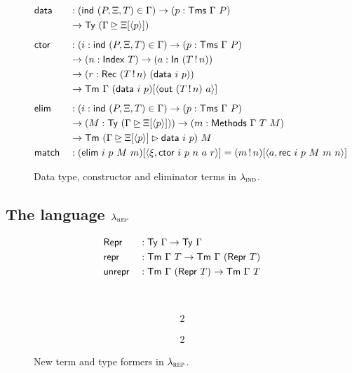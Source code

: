 \begin{figure}[H]
  \begin{alignat*}{2}
  & \mta{data} &&: (\mta{ind}\ (P, \Xi, T) \in \Gamma) \to (p : \Tms\ \Gamma\ P) \\ 
  &            && \to \Ty\ (\Gamma \unrhd \Xi[\langle p \rangle]) \\[0.5em]
  & \mta{ctor} &&: (i : \mta{ind}\ (P, \Xi, T) \in \Gamma) \to (p : \Tms\ \Gamma\ P) \\
  &            && \to (n : \mta{Index}\ T) \to (a : \mta{In}\ (T \, ! \, n)) \\
  &            && \to (r : \mta{Rec}\ (T \, ! \, n)\ (\mta{data}\ i\ p)) \\
  &            && \to \Tm\ \Gamma\ (\mta{data}\ i\ p) [\langle \mta{out}\ (T\,!\,n)\ a \rangle] \\[0.5em]
  & \mta{elim} &&: (i : \mta{ind}\ (P, \Xi, T) \in \Gamma) \to (p : \Tms\ \Gamma\ P) \\
  &            && \to (M : \Ty\ (\Gamma \unrhd \Xi[\langle p \rangle])) \to (m : \mta{Methods}\ \Gamma\ T\ M) \\
  &            && \to \Tm\ (\Gamma \unrhd \Xi[\langle p \rangle] \rhd \mta{data}\ i\ p)\ M \\
  & \mta{match} &&: (\mta{elim}\ i\ p\ M\ m)[\langle \xi, \mta{ctor}\ i\ p\ n\ a\ r \rangle] = (m\,!\,n)[\langle a , \mta{rec}\ i\ p\ M\ m\ n \rangle]
  \end{alignat*}
  \caption{Data type, constructor and eliminator terms in $\lambda_{\textsc{ind}}$.}
  \label{fig:lambdaind-data-ctor}
\end{figure}

\subsection{The language $\lambda_{\textsc{rep}}$}

\begin{figure}[H]
  \begin{minipage}[t]{\textwidth}%
  \begin{alignat*}{2}
  & \textsf{Repr} &&: \textsf{Ty}\ \Gamma \to \textsf{Ty}\ \Gamma \\
  & \textsf{repr} &&: \textsf{Tm}\ \Gamma\ T \to \textsf{Tm}\ \Gamma\ (\textsf{Repr}\ T) \\
  & \textsf{unrepr} &&: \textsf{Tm}\ \Gamma\ (\textsf{Repr}\ T) \to \textsf{Tm}\ \Gamma\ T
  \end{alignat*}
  \end{minipage}\\
  \begin{minipage}[t]{0.5\textwidth}%
  \begin{alignat*}{2}
  \end{alignat*}
  \end{minipage}%
  \begin{minipage}[t]{0.5\textwidth}%
  \begin{alignat*}{2}
  \end{alignat*}
  \end{minipage}%
  \caption{New term and type formers in $\lambda_{\textsc{rep}}$.}
  \label{fig:lambdarep-new-formers}
\end{figure}

